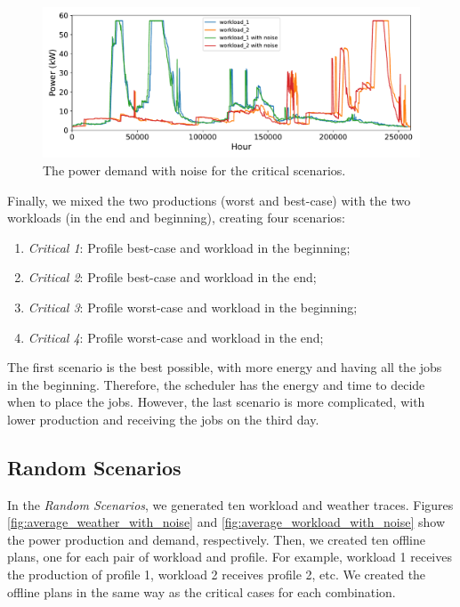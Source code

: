 \begin{figure}[!htb]
    \centering
    \includegraphics[scale=0.58]{Images/Compensations/critical_jobs_arriving_with_noise.pdf}
    \caption{The power demand with noise for the critical scenarios.}
    \label{fig:critical_workload_with_noise}
\end{figure}

Finally, we mixed the two productions (worst and best-case) with the two workloads (in the end and beginning), creating four scenarios:

\begin{enumerate}
    \item \emph{Critical 1}: Profile best-case and workload in the beginning;
    \item \emph{Critical 2}: Profile best-case and workload in the end;
    \item \emph{Critical 3}: Profile worst-case and workload in the beginning;
    \item \emph{Critical 4}: Profile worst-case and workload in the end;
\end{enumerate}

The first scenario is the best possible, with more energy and having all the jobs in the beginning. Therefore, the scheduler has the energy and time to decide when to place the jobs. However, the last scenario is more complicated, with lower production and receiving the jobs on the third day.

\subsection{Random Scenarios}

In the \emph{Random Scenarios}, we generated ten workload and weather traces. Figures \ref{fig:average_weather_with_noise} and \ref{fig:average_workload_with_noise} show the power production and demand, respectively. Then, we created ten offline plans, one for each pair of workload and profile. For example, workload 1 receives the production of profile 1, workload 2 receives profile 2, etc. We created the offline plans in the same way as the critical cases for each combination.

